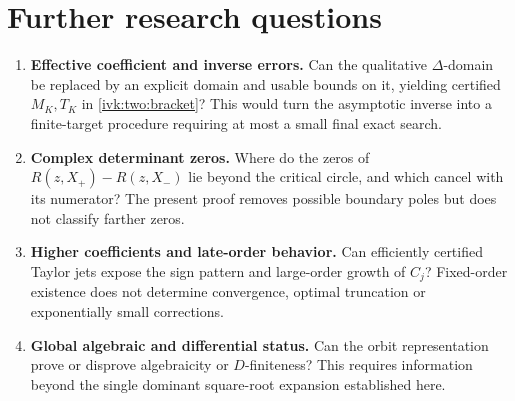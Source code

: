 \documentclass[11pt,letterpaper]{article}
\theoremstyle{remark}\newtheorem{remark}[theorem]{Remark}
\begin{document}
\section{Further research questions}\label{ivk:two:sec:questions}
\begin{enumerate}[label=\arabic*.]
\item \textbf{Effective coefficient and inverse errors.}
Can the qualitative $\Delta$-domain be replaced by an explicit domain
and usable bounds on it, yielding certified $M_K,T_K$ in
\eqref{ivk:two:bracket}? This would turn the asymptotic inverse into a
finite-target procedure requiring at most a small final exact search.
\item \textbf{Complex determinant zeros.}
Where do the zeros of $R(z,X_+)-R(z,X_-)$ lie beyond the critical
circle, and which cancel with its numerator? The present proof
removes possible boundary poles but does not classify farther zeros.
\item \textbf{Higher coefficients and late-order behavior.}
Can efficiently certified Taylor jets expose the sign pattern and
large-order growth of $C_j$? Fixed-order existence does not determine
convergence, optimal truncation or exponentially small corrections.
\item \textbf{Global algebraic and differential status.}
Can the orbit representation prove or disprove algebraicity or
$D$-finiteness? This requires information beyond the single dominant
square-root expansion established here.
\end{enumerate}
\end{document}
